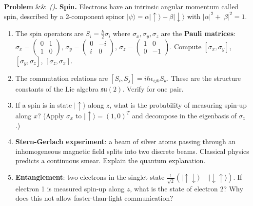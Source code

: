 \documentclass[12pt,a4paper]{article}
\newcounter{problem}
\newenvironment{problem}[1][]{\refstepcounter{problem}\par\vspace{6pt}\noindent\textbf{\color{MidBlue}Problem \theproblem}\ifx&#1&\else\ \textit{(#1)}\fi\textbf{.}\enskip}{\par\vspace{4pt}}
\begin{document}
\begin{problem}
\label{prob:spin}
\textbf{Spin.} Electrons have an intrinsic angular momentum called spin, described by a 2-component spinor $|\psi\rangle = \alpha|\uparrow\rangle + \beta|\downarrow\rangle$ with $|\alpha|^2+|\beta|^2=1$.
\begin{enumerate}[label=(\alph*),topsep=2pt]
  \item The spin operators are $S_i = \frac{\hbar}{2}\sigma_i$ where $\sigma_x,\sigma_y,\sigma_z$ are the \textbf{Pauli matrices}:
  $\sigma_x=\begin{pmatrix}0&1\\1&0\end{pmatrix}$, $\sigma_y=\begin{pmatrix}0&-i\\i&0\end{pmatrix}$, $\sigma_z=\begin{pmatrix}1&0\\0&-1\end{pmatrix}$.
  Compute $[\sigma_x,\sigma_y]$, $[\sigma_y,\sigma_z]$, $[\sigma_z,\sigma_x]$.
  \item The commutation relations are $[S_i,S_j]=i\hbar\epsilon_{ijk}S_k$. These are the structure constants of the Lie algebra $\mathfrak{su}(2)$. Verify for one pair.
  \item If a spin is in state $|\uparrow\rangle$ along $z$, what is the probability of measuring spin-up along $x$? (Apply $\sigma_x$ to $|\uparrow\rangle = (1,0)^T$ and decompose in the eigenbasis of $\sigma_x$.)
  \item \textbf{Stern-Gerlach experiment}: a beam of silver atoms passing through an inhomogeneous magnetic field splits into two discrete beams. Classical physics predicts a continuous smear. Explain the quantum explanation.
  \item \textbf{Entanglement}: two electrons in the singlet state $\frac{1}{\sqrt{2}}(|\uparrow\downarrow\rangle - |\downarrow\uparrow\rangle)$. If electron 1 is measured spin-up along $z$, what is the state of electron 2? Why does this not allow faster-than-light communication?
\end{enumerate}
\end{problem}
\end{document}
